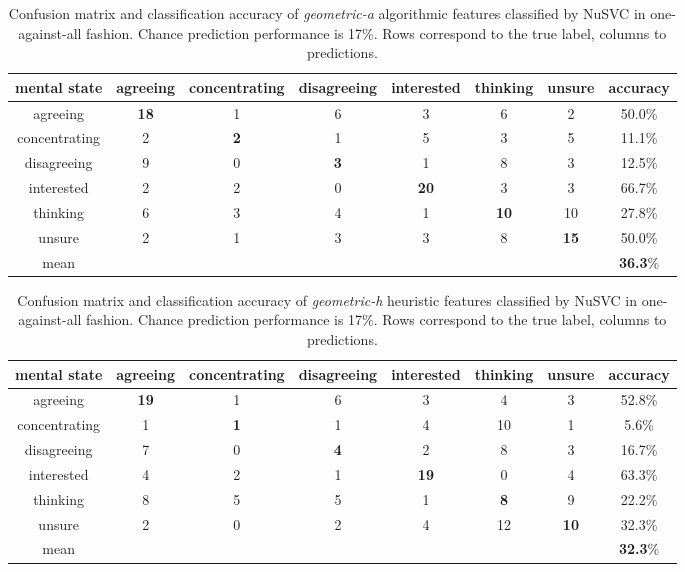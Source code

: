 \begin{table}[tb]
\centering
\caption[Confusion matrix and classification accuracy of \textit{geometric-a} algorithmic features classified by NuSVC in one-against-all fashion.]{Confusion matrix and classification accuracy of \textit{geometric-a} algorithmic features classified by NuSVC in one-against-all fashion. Chance prediction performance is 17\%. Rows correspond to the true label, columns to predictions.}
\scriptsize 
\begin{tabular}{ c || c | c | c | c | c | c || c  }
\hline
mental state&agreeing&concentrating&disagreeing&interested&thinking&unsure&accuracy\\
\hline
agreeing	&\textbf{18}	&1	&6	&3	&6	&2	&50.0\%\\
concentrating	&2	&\textbf{2}	&1	&5	&3	&5	&11.1\%\\
disagreeing	&9	&0	&\textbf{3}	&1	&8	&3	&12.5\%\\
interested	&2	&2	&0	&\textbf{20}	&3	&3	&66.7\%\\
thinking	&6	&3	&4	&1	&\textbf{10}	&10	&27.8\%\\
unsure		&2	&1	&3	&3	&8	&\textbf{15}	&50.0\%\\
mean		&	&	&	&	&	&	&\textbf{36.3}\%\\
\end{tabular}
\normalsize
\label{TableMindReadingAlg}
\end{table}

\begin{table}[tb]
\centering
\caption[Confusion matrix and classification accuracy of \textit{geometric-h} heuristic features classified by NuSVC in one-against-all fashion.]{Confusion matrix and classification accuracy of \textit{geometric-h} heuristic features classified by NuSVC in one-against-all fashion. Chance prediction performance is 17\%. Rows correspond to the true label, columns to predictions.}
\scriptsize 
\begin{tabular}{ c || c | c | c | c | c | c || c  }
\hline
mental state&agreeing&concentrating&disagreeing&interested&thinking&unsure&accuracy\\
\hline
agreeing	&\textbf{19}	&1	&6	&3	&4	&3	&52.8\%\\
concentrating	&1	&\textbf{1}	&1	&4	&10	&1	&5.6\%\\
disagreeing	&7	&0	&\textbf{4}	&2	&8	&3	&16.7\%\\
interested	&4	&2	&1	&\textbf{19}	&0	&4	&63.3\%\\
thinking	&8	&5	&5	&1	&\textbf{8}	&9	&22.2\%\\
unsure		&2	&0	&2	&4	&12	&\textbf{10}	&32.3\%\\
mean		&	&	&	&	&	&	&\textbf{32.3}\%\\
\end{tabular}
\normalsize
\label{TableMindReadingHeur}
\end{table}

